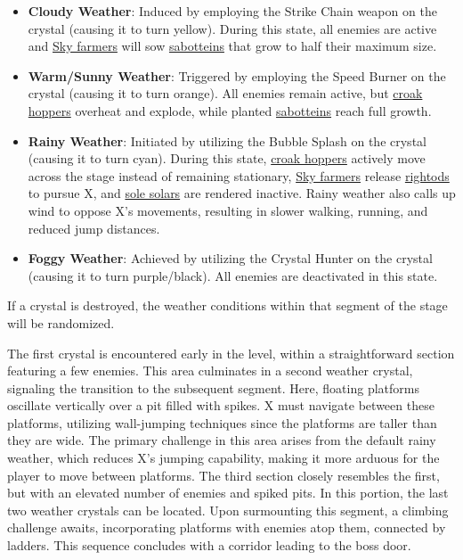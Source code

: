 \begin{itemize}
\item \textbf{Cloudy Weather}: Induced by employing the Strike Chain weapon on the crystal (causing it to turn yellow). During this state, all enemies are active and \hyperlink{enem:Sky_farmer}{Sky farmers} will sow \hyperlink{enem:Sabottein}{sabotteins} that grow to half their maximum size.

\item \textbf{Warm/Sunny Weather}: Triggered by employing the Speed Burner on the crystal (causing it to turn orange). All enemies remain active, but \hyperlink{enem:Croak_hopper}{croak hoppers} overheat and explode, while planted \hyperlink{enem:Sabottein}{sabotteins} reach full growth.

\item \textbf{Rainy Weather}: Initiated by utilizing the Bubble Splash on the crystal (causing it to turn cyan). During this state, \hyperlink{enem:Croak_hopper}{croak hoppers} actively move across the stage instead of remaining stationary, \hyperlink{enem:Sky_farmer}{Sky farmers} release \hyperlink{enem:Rightod}{rightods} to pursue X, and \hyperlink{enem:Sole_solar}{sole solars} are rendered inactive. Rainy weather also calls up wind to oppose X's movements, resulting in slower walking, running, and reduced jump distances.

\item \textbf{Foggy Weather}: Achieved by utilizing the Crystal Hunter on the crystal (causing it to turn purple/black). All enemies are deactivated in this state.
\end{itemize}

If a crystal is destroyed, the weather conditions within that segment of the stage will be randomized.

The first crystal is encountered early in the level, within a straightforward section featuring a few enemies. This area culminates in a second weather crystal, signaling the transition to the subsequent segment. Here, floating platforms oscillate vertically over a pit filled with spikes. X must navigate between these platforms, utilizing wall-jumping techniques since the platforms are taller than they are wide. The primary challenge in this area arises from the default rainy weather, which reduces X's jumping capability, making it more arduous for the player to move between platforms. The third section closely resembles the first, but with an elevated number of enemies and spiked pits. In this portion, the last two weather crystals can be located. Upon surmounting this segment, a climbing challenge awaits, incorporating platforms with enemies atop them, connected by ladders. This sequence concludes with a corridor leading to the boss door.

